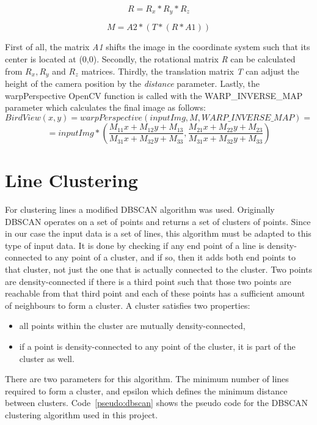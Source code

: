 \documentclass[Report.tex]{subfiles}
\begin{document}
\[
R=R_{x}*R_{y}*R_{z}
\]

\[
M = A2*(T*(R*A1))
\]
\Large

First of all, the matrix \textit{A1} shifts the image in the coordinate system such that its center is located at (0,0).
Secondly, the rotational matrix \textit{R} can be calculated from \textit{$R_{x}, R_{y}$}
and \textit{$R_{z}$} matrices.  Thirdly, the translation matrix \textit{T} can adjust
the height of the camera position by the \textit{distance} parameter. Lastly, the
warpPerspective OpenCV function is called with the WARP\_INVERSE\_MAP parameter
which calculates the final image as follows:
\normalsize
\[BirdView(x,y)= warpPerspective(inputImg, M, WARP\_INVERSE\_MAP) = \]
\[= inputImg*(\frac{M_{11}x+M_{12}y+M_{13}}{M_{31}x+M_{32}y+M_{33}},\frac{M_{21}x+M_{22}y+M_{23}}{M_{31}x+M_{32}y+M_{33}})\]
\Large

\section{Line Clustering} %
\label{sec:Line Clustering}
For clustering lines a modified DBSCAN\cite{www:dbscan} algorithm was used. Originally
DBSCAN operates on a set of points and returns a set of clusters of points.
Since in our case the input data is a set of lines, this algorithm must be
adapted to this type of input data. It is done by checking if any end point of
a line is density-connected to any point of a cluster, and if so, then it adds both end
points to that cluster, not just the one that is actually connected to the
cluster.  Two points are density-connected if there is a third point such that
those two points are reachable from that third point and each of these points
has a sufficient amount of neighbours to form a cluster.
A cluster satisfies two properties:
\begin{itemize}
  \item all points within the cluster are mutually density-connected,
  \item if a point is density-connected to any point of the cluster, it is part
of the cluster as well.
\end{itemize}
There are two parameters for this algorithm. The minimum number of lines
required to form a cluster, and epsilon which defines the minimum distance
between clusters.
Code~\ref{pseudo:dbscan} shows the pseudo code for the DBSCAN clustering
algorithm used in this project.
\end{document}

